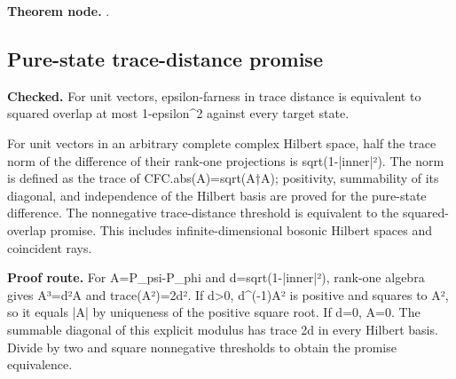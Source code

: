 
\textbf{Theorem node.} .

\subsection{Pure-state trace-distance promise}\label{paper:trace-distance}
\textbf{Checked.} For unit vectors, epsilon-farness in trace distance is equivalent to squared overlap at most 1-epsilon\textasciicircum{}2 against every target state. 

For unit vectors in an arbitrary complete complex Hilbert space, half the trace norm of the difference of their rank-one projections is sqrt(1-|inner|²). The norm is defined as the trace of CFC.abs(A)=sqrt(A†A); positivity, summability of its diagonal, and independence of the Hilbert basis are proved for the pure-state difference. The nonnegative trace-distance threshold is equivalent to the squared-overlap promise. This includes infinite-dimensional bosonic Hilbert spaces and coincident rays.

\textbf{Proof route.} For A=P\_psi-P\_phi and d=sqrt(1-|inner|²), rank-one algebra gives A³=d²A and trace(A²)=2d². If d>0, d\textasciicircum{}(-1)A² is positive and squares to A², so it equals |A| by uniqueness of the positive square root. If d=0, A=0. The summable diagonal of this explicit modulus has trace 2d in every Hilbert basis. Divide by two and square nonnegative thresholds to obtain the promise equivalence.

